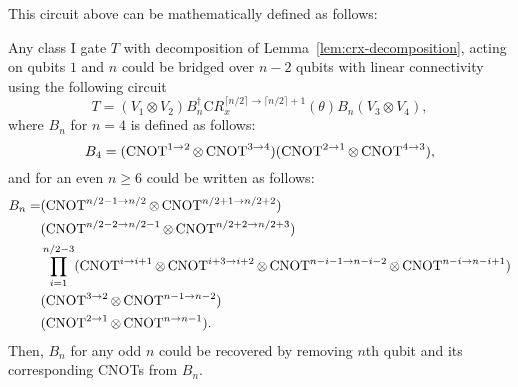 This circuit above can be mathematically defined as follows:

\begin{theorem}
  Any class I gate $T$ with decomposition of Lemma~\ref{lem:crx-decomposition}, acting on qubits $1$ and $n$ could be bridged over $n-2$ qubits with linear connectivity using the following circuit  
  \begin{equation}
    T = (V_1 \otimes V_2) B^\dagger_n \mathrm{C}R_x^{\lceil n/2 \rceil \to \lceil n/2\rceil+1}(\theta) B_n (V_3 \otimes V_4),
  \end{equation}
  where $B_n$ for $n = 4$ is defined as follows:
  \begin{equation}
    B_4 = (\operatorname{CNOT}^{1 \to 2} \otimes \operatorname{CNOT}^{3 \to 4}) (\operatorname{CNOT}^{2 \to 1} \otimes \operatorname{CNOT}^{4 \to 3}),
  \end{equation}
  and for an even $n \ge 6$ could be written as follows:
  \begin{equation}
    \begin{aligned}
    B_{n} = &(\operatorname{CNOT}^{n/2 - 1 \to n/2} \otimes \operatorname{CNOT}^{n/2 + 1 \to n/2 + 2}) \\
    &(\operatorname{CNOT}^{n/2 - 2 \to n/2 - 1} \otimes \operatorname{CNOT}^{n/2 + 2 \to n/2 + 3}) \\
    &\prod_{i=1}^{n/2 - 3} (\operatorname{CNOT}^{i \to i+1} \otimes \operatorname{CNOT}^{i+3 \to i+2} \otimes \operatorname{CNOT}^{n-i-1 \to n-i-2} \otimes \operatorname{CNOT}^{n-i \to n-i+1}) \\
    &(\operatorname{CNOT}^{3 \to 2} \otimes \operatorname{CNOT}^{n-1 \to n-2}) \\
    &(\operatorname{CNOT}^{2 \to 1} \otimes \operatorname{CNOT}^{n \to n-1}).
    \end{aligned}
  \end{equation}
  Then, $B_n$ for any odd $n$ could be recovered by removing $n$th qubit and its corresponding CNOTs from $B_n$.
\end{theorem}
